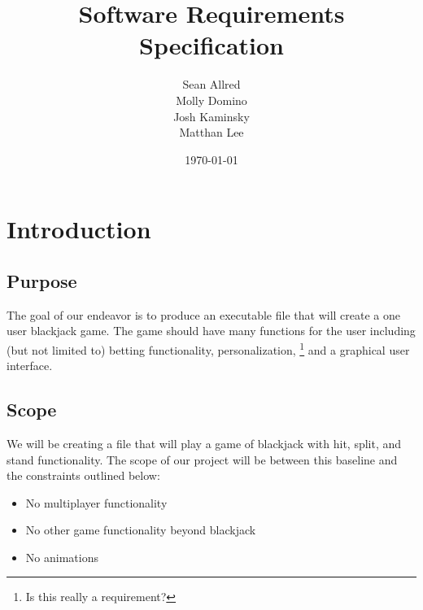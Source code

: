 \documentclass[12pt]{article}
\author{Sean Allred \\ Molly Domino \\ Josh Kaminsky \\ Matthan Lee}
\date{\today}
\title{Software Requirements Specification}
\begin{document}
\maketitle
\thispagestyle{empty}
\newpage
\null
\section{Introduction}

\subsection{Purpose}
The goal of our endeavor is to produce an executable file that will create a
one user blackjack game.  The game should have many functions for the user
including (but not limited to) betting functionality, personalization,
\footnote{Is this really a requirement?} and a graphical user interface.

\subsection{Scope}
We will be creating a file that will play a game of blackjack with hit, split,
and stand functionality. The scope of our project will be between this baseline
and the constraints outlined below:
\begin{itemize}
\item No multiplayer functionality
\item No other game functionality beyond blackjack
\item No animations
\end{itemize}
\end{document}
